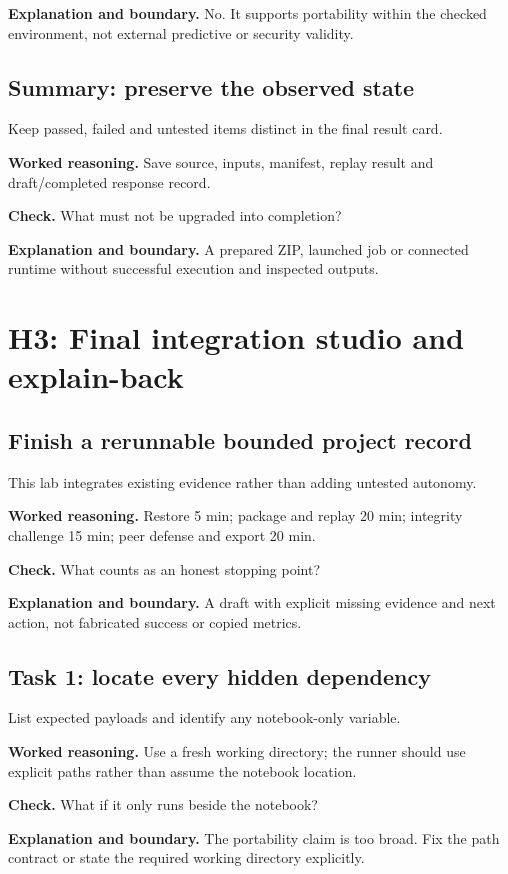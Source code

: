 \textbf{Explanation and boundary.} No. It supports portability within the checked environment, not external predictive or security validity.

\subsection{Summary: preserve the observed state}
Keep passed, failed and untested items distinct in the final result card.

\textbf{Worked reasoning.} Save source, inputs, manifest, replay result and draft/completed response record.

\textbf{Check.} What must not be upgraded into completion?

\textbf{Explanation and boundary.} A prepared ZIP, launched job or connected runtime without successful execution and inspected outputs.

\section{H3: Final integration studio and explain-back}
\subsection{Finish a rerunnable bounded project record}
This lab integrates existing evidence rather than adding untested autonomy.

\textbf{Worked reasoning.} Restore 5 min; package and replay 20 min; integrity challenge 15 min; peer defense and export 20 min.

\textbf{Check.} What counts as an honest stopping point?

\textbf{Explanation and boundary.} A draft with explicit missing evidence and next action, not fabricated success or copied metrics.

\subsection{Task 1: locate every hidden dependency}
List expected payloads and identify any notebook-only variable.

\textbf{Worked reasoning.} Use a fresh working directory; the runner should use explicit paths rather than assume the notebook location.

\textbf{Check.} What if it only runs beside the notebook?

\textbf{Explanation and boundary.} The portability claim is too broad. Fix the path contract or state the required working directory explicitly.

